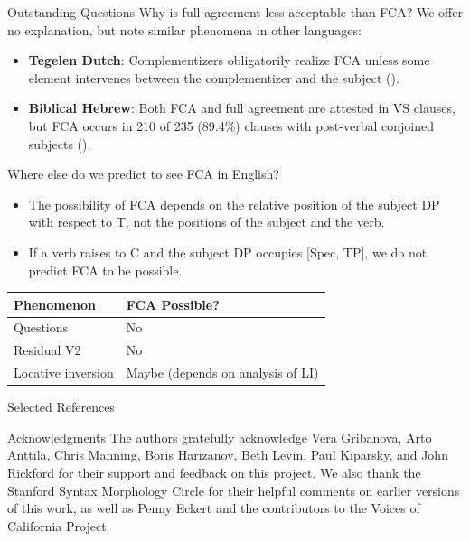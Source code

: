 \documentclass[final]{beamer}
\newlength{\onecolwid}
\begin{document}
\begin{frame}[t]
\begin{columns}[t]
\begin{column}{\onecolwid}
\begin{block}{Outstanding Questions}
Why is full agreement less acceptable than FCA? We offer no explanation, but note similar phenomena in other languages:
\begin{itemize}
\item \textbf{Tegelen Dutch}: Complementizers obligatorily realize FCA unless some element intervenes between the complementizer and the subject (\citealt{vanKoppen:2012}).
\item \textbf{Biblical Hebrew}: Both FCA and full agreement are attested in VS clauses, but FCA occurs in 210 of 235 (89.4\%) clauses with post-verbal conjoined subjects (\citealt{Moreshet:1967, Doron:2000}).
\end{itemize}
Where else do we predict to see FCA in English?
\begin{itemize}
\item The possibility of FCA depends on the relative position of the subject DP with respect to T, not the positions of the subject and the verb. 
\item If a verb raises to C and the subject DP occupies [Spec, TP], we do not predict FCA to be possible.
\end{itemize}
\begin{center}
    \begin{tabular}{ll}
    Phenomenon & FCA Possible? \\
    \hline
    Questions & No\\
    Residual V2 & No \\
    Locative inversion & Maybe (depends on analysis of LI)
    \end{tabular}
\end{center}

\end{block}

\begin{block}{Selected References}



\end{block}

\begin{block}{Acknowledgments}\vspace{0.5em}
\small{The authors gratefully acknowledge Vera Gribanova, Arto Anttila, Chris Manning, Boris Harizanov, Beth Levin, Paul Kiparsky, and John Rickford for their support and feedback on this project. We also thank the Stanford Syntax Morphology Circle for their helpful comments on earlier versions of this work, as well as Penny Eckert and the contributors to the Voices of California Project.} \\


\end{block}
\end{column}
\end{columns}
\end{frame}
\end{document}

